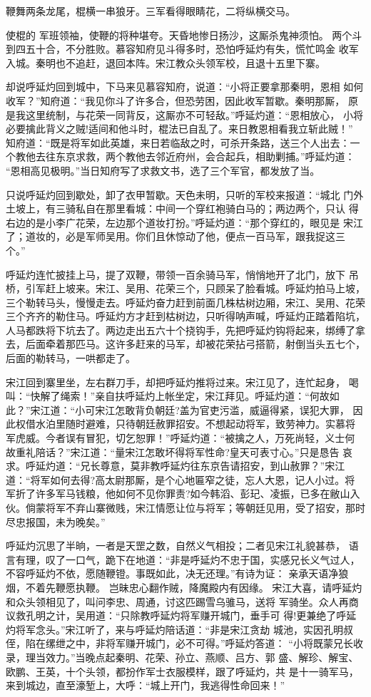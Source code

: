 鞭舞两条龙尾，棍横一串狼牙。三军看得眼睛花，二将纵横交马。

使棍的
军班领袖，使鞭的将种堪夸。天昏地惨日扬沙，这厮杀鬼神须怕。
两个斗到四五十合，不分胜败。慕容知府见斗得多时，恐怕呼延灼有失，慌忙鸣金
收军入城。秦明也不追赶，退回本阵。宋江教众头领军校，且退十五里下寨。

却说呼延灼回到城中，下马来见慕容知府，说道：“小将正要拿那秦明，恩相
如何收军？”知府道：“我见你斗了许多合，但恐劳困，因此收军暂歇。秦明那厮，
原是我这里统制，与花荣一同背反，这厮亦不可轻敌。”呼延灼道：“恩相放心，
小将必要擒此背义之贼!适间和他斗时，棍法已自乱了。来日教恩相看我立斩此贼！”
知府道：“既是将军如此英雄，来日若临敌之时，可杀开条路，送三个人出去：一
个教他去往东京求救，两个教他去邻近府州，会合起兵，相助剿捕。”呼延灼道：
“恩相高见极明。”当日知府写了求救文书，选了三个军官，都发放了当。

只说呼延灼回到歇处，卸了衣甲暂歇。天色未明，只听的军校来报道：“城北
门外土坡上，有三骑私自在那里看城：中间一个穿红袍骑白马的；两边两个，只认
得右边的是小李广花荣，左边那个道妆打扮。”呼延灼道：“那个穿红的，眼见是
宋江了；道妆的，必是军师吴用。你们且休惊动了他，便点一百马军，跟我捉这三
个。”

呼延灼连忙披挂上马，提了双鞭，带领一百余骑马军，悄悄地开了北门，放下
吊桥，引军赶上坡来。宋江、吴用、花荣三个，只顾呆了脸看城。呼延灼拍马上坡，
三个勒转马头，慢慢走去。呼延灼奋力赶到前面几株枯树边厢，宋江、吴用、花荣
三个齐齐的勒住马。呼延灼方才赶到枯树边，只听得呐声喊，呼延灼正踏着陷坑，
人马都跌将下坑去了。两边走出五六十个挠钩手，先把呼延灼钩将起来，绑缚了拿
去，后面牵着那匹马。这许多赶来的马军，却被花荣拈弓搭箭，射倒当头五七个，
后面的勒转马，一哄都走了。

宋江回到寨里坐，左右群刀手，却把呼延灼推将过来。宋江见了，连忙起身，
喝叫：“快解了绳索！”亲自扶呼延灼上帐坐定，宋江拜见。呼延灼道：“何故如
此？”宋江道：“小可宋江怎敢背负朝廷?盖为官吏污滥，威逼得紧，误犯大罪，
因此权借水泊里随时避难，只待朝廷赦罪招安。不想起动将军，致劳神力。实慕将
军虎威。今者误有冒犯，切乞恕罪！”呼延灼道：“被擒之人，万死尚轻，义士何
故重礼陪话？”宋江道：“量宋江怎敢坏得将军性命?皇天可表寸心。”只是恳告
哀求。呼延灼道：“兄长尊意，莫非教呼延灼往东京告请招安，到山赦罪？”宋江
道：“将军如何去得?高太尉那厮，是个心地匾窄之徒，忘人大恩，记人小过。将
军折了许多军马钱粮，他如何不见你罪责?如今韩滔、彭玘、凌振，已多在敝山入
伙。倘蒙将军不弃山寨微贱，宋江情愿让位与将军；等朝廷见用，受了招安，那时
尽忠报国，未为晚矣。”

呼延灼沉思了半晌，一者是天罡之数，自然义气相投；二者见宋江礼貌甚恭，
语言有理，叹了一口气，跪下在地道：“非是呼延灼不忠于国，实感兄长义气过人，
不容呼延灼不依，愿随鞭镫。事既如此，决无还理。”有诗为证：
亲承天语净狼烟，不着先鞭愿执鞭。
岂昧忠心翻作贼，降魔殿内有因缘。
宋江大喜，请呼延灼和众头领相见了，叫问李忠、周通，讨这匹踢雪乌骓马，送将
军骑坐。众人再商议救孔明之计，吴用道：“只除教呼延灼将军赚开城门，垂手可
得!更兼绝了呼延灼将军念头。”宋江听了，来与呼延灼陪话道：“非是宋江贪劫
城池，实因孔明叔侄，陷在缧绁之中，非将军赚开城门，必不可得。”呼延灼答道：
“小将既蒙兄长收录，理当效力。”当晚点起秦明、花荣、孙立、燕顺、吕方、郭
盛、解珍、解宝、欧鹏、王英，十个头领，都扮作军士衣服模样，跟了呼延灼，共
是十一骑军马，来到城边，直至濠堑上，大呼：“城上开门，我逃得性命回来！”

